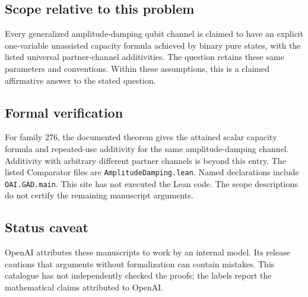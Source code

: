 \documentclass[11pt]{article}
\begin{document}
\subsection{Scope relative to this problem}
Every generalized amplitude-damping qubit channel is claimed to have an explicit one-variable unassisted capacity formula achieved by binary pure states, with the listed universal partner-channel additivities. The question retains these same parameters and conventions. Within these assumptions, this is a claimed affirmative answer to the stated question.

\subsection{Formal verification}
For family 276, the documented theorem gives the attained scalar capacity formula and repeated-use additivity for the same amplitude-damping channel. Additivity with arbitrary different partner channels is beyond this entry. The listed Comparator files are \texttt{AmplitudeDamping.lean}. Named declarations include \texttt{OAI.GAD.main}. This site has not executed the Lean code. The scope descriptions do not certify the remaining manuscript arguments.

\subsection{Status caveat}
OpenAI attributes these manuscripts to work by an internal model. Its release cautions that arguments without formalization can contain mistakes. This catalogue has not independently checked the proofs; the labels report the mathematical claims attributed to OpenAI.
\end{document}
